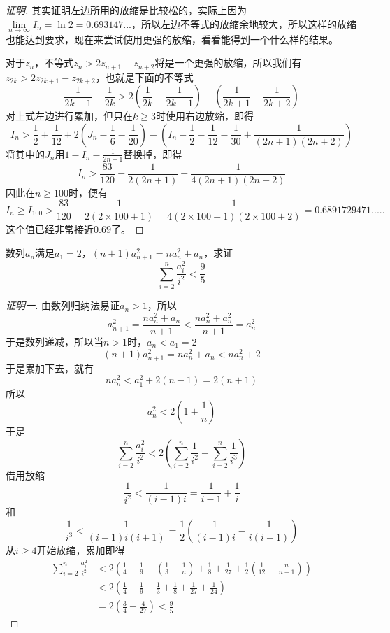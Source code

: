 \begin{proof}[证明]
其实证明左边所用的放缩是比较松的，实际上因为$\lim\limits_{n\to\infty}I_n=\ln{2}=0.693147...$，所以左边不等式的放缩余地较大，所以这样的放缩也能达到要求，现在来尝试使用更强的放缩，看看能得到一个什么样的结果。

对于$z_{n}$，不等式$z_n>2z_{n+1}-z_{n+2}$将是一个更强的放缩，所以我们有$z_{2k}>2z_{2k+1}-z_{2k+2}$，也就是下面的不等式
\begin{equation*}
  \frac{1}{2k-1}-\frac{1}{2k} > 2 \left( \frac{1}{2k}-\frac{1}{2k+1} \right) - \left( \frac{1}{2k+1}-\frac{1}{2k+2} \right)
\end{equation*}
对上式左边进行累加，但只在$k\geqslant 3$时使用右边放缩，即得
\begin{equation*}
  I_n > \frac{1}{2}+\frac{1}{12} + 2 \left( J_n-\frac{1}{6}-\frac{1}{20} \right) - \left( I_n-\frac{1}{2}-\frac{1}{12}-\frac{1}{30}+\frac{1}{(2n+1)(2n+2)} \right)
\end{equation*}
将其中的$J_{n}$用$1-I_n-\frac{1}{2n+1}$替换掉，即得
\begin{equation*}
  I_n>\frac{83}{120}-\frac{1}{2(2n+1)}-\frac{1}{4(2n+1)(2n+2)}
\end{equation*}
因此在$n \geqslant 100$时，便有
\begin{equation*}
  I_n \geqslant I_{100} > \frac{83}{120}-\frac{1}{2(2\times 100+1)}-\frac{1}{4(2\times 100+1)(2 \times 100 + 2)} = 0.6891729471.....
\end{equation*}
这个值已经非常接近$0.69$了。
\end{proof}

\begin{exercise}
  数列$a_n$满足$a_1=2$，$(n+1)a_{n+1}^2=na_n^2+a_n$，求证
  \[ \sum_{i=2}^n \frac{a_i^2}{i^2}<\frac{9}{5} \]
\end{exercise}

\exerciseFrom[\url{http://kuing.orzweb.net/viewthread.php?tid=4542}]

\exerciseSolvedDate[2017-04-09]

\begin{proof}[证明一]
  由数列归纳法易证$a_n>1$，所以
\[ a_{n+1}^2=\frac{na_n^2+a_n}{n+1} < \frac{na_n^2+a_n^2}{n+1} = a_n^2 \]
于是数列递减，所以当$n>1$时，$a_n < a_1=2$
\[ (n+1)a_{n+1}^2 = na_n^2+a_n < na_n^2+2\]
于是累加下去，就有
\[ na_n^2 < a_1^2+2(n-1)=2(n+1) \]
所以
\[ a_n^2 < 2 \left( 1+\frac{1}{n} \right) \]
于是
\[ \sum_{i=2}^n \frac{a_i^2}{i^2} <2 \left( \sum_{i=2}^n \frac{1}{i^2}+\sum_{i=2}^n \frac{1}{i^3} \right) \]
借用放缩
\[ \frac{1}{i^2}<\frac{1}{(i-1)i}=\frac{1}{i-1}+\frac{1}{i} \]
和
\[ \frac{1}{i^3}<\frac{1}{(i-1)i(i+1)} = \frac{1}{2} \left( \frac{1}{(i-1)i}-\frac{1}{i(i+1)} \right) \]
从$i \geqslant 4$开始放缩，累加即得
\begin{align*}
\sum_{i=2}^n \frac{a_i^2}{i^2} & < 2 \left( \frac{1}{4}+\frac{1}{9}+(\frac{1}{3}-\frac{1}{n})+\frac{1}{8}+\frac{1}{27}+\frac{1}{2}(\frac{1}{12}-\frac{n}{n+1}) \right) \\
& < 2 \left( \frac{1}{4}+\frac{1}{9}+\frac{1}{3}+\frac{1}{8}+\frac{1}{27}+\frac{1}{24} \right) \\
& = 2 \left( \frac{3}{4}+\frac{4}{27} \right)<\frac{9}{5}
\end{align*}
\end{proof}

